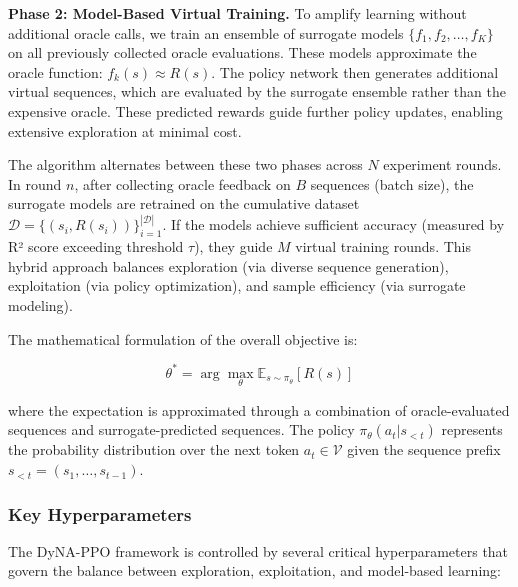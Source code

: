 \documentclass[conference]{IEEEtran}
\begin{document}
\textbf{Phase 2: Model-Based Virtual Training.} To amplify learning without additional oracle calls, we train an ensemble of surrogate models $\{f_1, f_2, \ldots, f_K\}$ on all previously collected oracle evaluations. These models approximate the oracle function: $f_k(s) \approx R(s)$. The policy network then generates additional virtual sequences, which are evaluated by the surrogate ensemble rather than the expensive oracle. These predicted rewards guide further policy updates, enabling extensive exploration at minimal cost.

The algorithm alternates between these two phases across $N$ experiment rounds. In round $n$, after collecting oracle feedback on $B$ sequences (batch size), the surrogate models are retrained on the cumulative dataset $\mathcal{D} = \{(s_i, R(s_i))\}_{i=1}^{|\mathcal{D}|}$. If the models achieve sufficient accuracy (measured by R² score exceeding threshold $\tau$), they guide $M$ virtual training rounds. This hybrid approach balances exploration (via diverse sequence generation), exploitation (via policy optimization), and sample efficiency (via surrogate modeling).

The mathematical formulation of the overall objective is:

\begin{equation}
\theta^* = \arg\max_{\theta} \mathbb{E}_{s \sim \pi_\theta}[R(s)]
\end{equation}

where the expectation is approximated through a combination of oracle-evaluated sequences and surrogate-predicted sequences. The policy $\pi_\theta(a_t | s_{<t})$ represents the probability distribution over the next token $a_t \in \mathcal{V}$ given the sequence prefix $s_{<t} = (s_1, \ldots, s_{t-1})$.

\subsubsection{Key Hyperparameters}

The DyNA-PPO framework is controlled by several critical hyperparameters that govern the balance between exploration, exploitation, and model-based learning:
\end{document}
